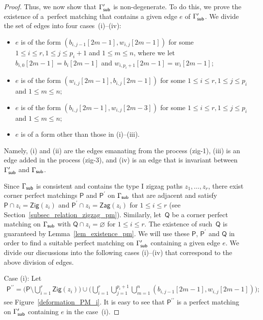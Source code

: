 \documentclass[11pt]{article}
\numberwithin{equation}{section}
\numberwithin{equation}{section}
\numberwithin{figure}{section}
\numberwithin{table}{section}
\newcommand{\sfP}{\mathsf{P}}
\newcommand{\sfQ}{\mathsf{Q}}
\newcommand{\Zig}{\mathsf{Zig}}
\newcommand{\Zag}{\mathsf{Zag}}
\begin{document}
\begin{proof}
Thus, we now show that $\Gamma^\prime_{\sf sub}$ is non-degenerate.
To do this, we prove the existence of a~perfect matching that contains a given edge $e$ of $\Gamma^\prime_{\sf sub}$.
We divide the set of edges into four cases~(i)--(iv):
\begin{itemize}\itemsep=0pt
\item[(i)] $e$ is of the form $(b_{i,j-1}[2m-1], w_{i,j}[2m-1])$ for some $1 \leq i \leq r, 1 \leq j \leq p_i+1$ and $1 \leq m \leq n$,
where we let $b_{i,0}[2m-1]=b_i[2m-1]$ and $w_{i,p_i+1}[2m-1]=w_i[2m-1]$;
\item[(ii)] $e$ is of the form $(w_{i,j}[2m-1], b_{i,j}[2m-1])$ for some $1 \leq i \leq r, 1 \leq j \leq p_i$ and $1 \leq m \leq n$;
\item[(iii)] $e$ is of the form $(b_{i,j}[2m-1],w_{i,j}[2m-3])$ for some $1 \leq i \leq r, 1 \leq j \leq p_i$ and $1 \leq m \leq n$;
\item[(iv)] $e$ is of a form other than those in (i)--(iii).
\end{itemize}
Namely, (i) and (ii) are the edges emanating from the process (zig-1), (iii) is an edge added in the process (zig-3), and (iv) is an edge that is invariant between $\Gamma^\prime_{\sf sub}$ and $\Gamma_{\sf sub}$.

Since $\Gamma_{\sf sub}$ is consistent and contains the type I zigzag paths $z_1,\dots,z_r$,
there exist corner perfect matchings $\sfP$ and $\sfP^\prime$ on $\Gamma_{\sf sub}$ that are adjacent and satisfy $\sfP \cap z_i=\Zig(z_i)$ and $\sfP^\prime \cap z_i=\Zag(z_i)$ for $1 \leq i \leq r$ (see Section~\ref{subsec_relation_zigzag_pm}).
Similarly, let~$\sfQ$ be a corner perfect matching on $\Gamma_{\sf sub}$ with $\sfQ \cap z_i = \varnothing$ for $1 \leq i \leq r$.
The existence of such~$\sfQ$ is guaranteed by Lemma~\ref{lem_existence_pm}.
We will use these $\sfP$, $\sfP^\prime$ and $\sfQ$ in order to find a suitable perfect matching on $\Gamma^\prime_{\sf sub}$ containing a given edge $e$.
We divide our discussions into the following cases (i)--(iv) that correspond to the above division of edges.

Case (i): Let \begin{gather}\label{PM_case(i)}
\sfP^{\prime\prime}=\bigg(\sfP \setminus \bigcup_{i=1}^r \Zig(z_i)\bigg) \cup \bigg(\bigcup_{i=1}^r \bigcup_{j=1}^{p_i+1} \bigcup_{m=1}^n(b_{i,j-1}[2m-1],w_{i,j}[2m-1])\bigg);
\end{gather}
see Figure~\ref{deformation_PM_i}. It is easy to see that $\sfP^{\prime\prime}$ is a perfect matching on $\Gamma^\prime_{\sf sub}$ containing $e$ in the case~(i).


\end{proof}
\end{document}
